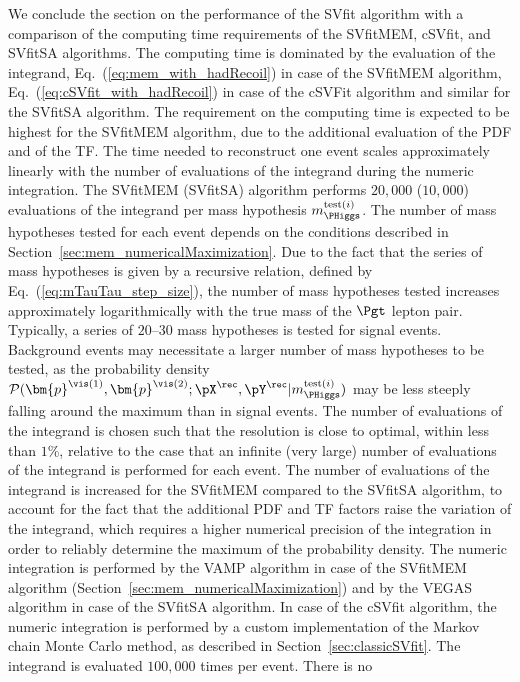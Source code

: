 We conclude the section on the performance of the SVfit algorithm
with a comparison of the computing time requirements of the SVfitMEM,
cSVfit, and SVfitSA algorithms.
The computing time is dominated by the
evaluation of the integrand, Eq.~(\ref{eq:mem_with_hadRecoil}) in case
of the SVfitMEM algorithm, Eq.~(\ref{eq:cSVfit_with_hadRecoil}) in case of the cSVFit
algorithm and similar for the SVfitSA algorithm.
The requirement on the computing time is expected to be
highest for the SVfitMEM algorithm, due to the additional evaluation of the PDF and of the TF.
The time needed to reconstruct one event scales approximately linearly
with the number of evaluations of the integrand during the numeric
integration.
The SVfitMEM (SVfitSA) algorithm performs $20,000$ ($10,000$)
evaluations of the integrand per mass hypothesis
$m_{\PHiggs}^{\textrm{test}(i)}$.
The number of mass hypotheses tested for each event depends on the
conditions described in Section~\ref{sec:mem_numericalMaximization}.
Due to the fact that the series of mass hypotheses is given by a
recursive relation,
defined by Eq.~(\ref{eq:mTauTau_step_size}), the number of mass
hypotheses tested increases approximately logarithmically with the
true mass of the $\Pgt$ lepton pair. Typically, a series of $20$--$30$
mass hypotheses is tested for signal events. Background events may
necessitate a larger number of mass hypotheses to be tested, as the
probability density
$\mathcal{P}(\bm{p}^{\vis(1)},\bm{p}^{\vis(2)};\pX^{\rec},\pY^{\rec}|m_{\PHiggs}^{\textrm{test}(i)})$
may be less steeply falling around the maximum than in signal events.
The number of evaluations of the integrand is chosen such that the
resolution is close to optimal, within less than $1\%$, relative to
the case that an infinite (very large) number of evaluations of the
integrand is performed for each event.
The number of evaluations of the integrand is increased for the SVfitMEM
compared to the SVfitSA algorithm, to account for the fact that the additional PDF and TF factors
raise the variation of the integrand,
which requires a higher numerical precision of the integration in
order to reliably determine the maximum of the probability density.
The numeric integration is performed by the VAMP algorithm in case of
the SVfitMEM algorithm (\cf Section~\ref{sec:mem_numericalMaximization}) and by the VEGAS algorithm
in case of the SVfitSA algorithm.
In case of the cSVfit algorithm, the numeric integration is performed
by a custom implementation of the Markov chain Monte Carlo method, as described in Section~\ref{sec:classicSVfit}.
The integrand is evaluated $100,000$ times per event. There is no
